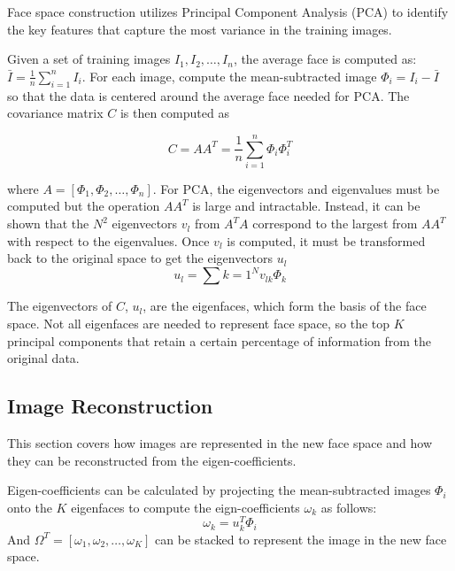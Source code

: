 \documentclass[12pt, letterpaper]{article}
\begin{document}

Face space construction utilizes Principal Component Analysis (PCA) to identify the
key features that capture the most variance in the training images.

Given a set of training images $I_1, I_2, \ldots, I_n$, the average face is computed as:
$\bar{I} = \frac{1}{n} \sum_{i=1}^n I_i$. For each image, compute the mean-subtracted image
$\Phi_i = I_i - \bar{I}$ so that the data is centered around the average face needed for PCA.
The covariance matrix $C$ is then computed as

\begin{equation}
	C = AA^T = \frac{1}{n} \sum_{i=1}^n \Phi_i \Phi_i^T
\end{equation}

where $A = [\Phi_1, \Phi_2, \ldots, \Phi_n]$. For PCA, the eigenvectors and eigenvalues must be
computed but the operation $AA^T$ is large and intractable. Instead, it can be shown that the
$N^2$ eigenvectors $v_l$ from $A^TA$ correspond to the largest from $AA^T$ with
respect to the eigenvalues. Once $v_l$ is computed, it must be transformed back to the original
space to get the eigenvectors $u_l$
\begin{equation}
	u_l = \sum{k=1}^N v_{lk} \Phi_k
\end{equation}

The eigenvectors of $C$, $u_l$, are the eigenfaces, which form the basis of the face space.
Not all eigenfaces are needed to represent face space, so the top $K$ principal components
that retain a certain percentage of information from the original data.

\subsection{Image Reconstruction}

This section covers how images are represented in the new face space and how they can be
reconstructed from the eigen-coefficients.

Eigen-coefficients can be calculated by projecting the mean-subtracted images $\Phi_i$ onto
the $K$ eigenfaces to compute the eign-coefficients $\omega_k$ as follows:
\begin{equation}
	\omega_k = u_k^T \Phi_i
\end{equation}
\label{eq:eigen_coefficients}
And $\Omega^T = [\omega_1, \omega_2, \ldots, \omega_K]$ can be stacked to represent the image
in the new face space.
\end{document}
